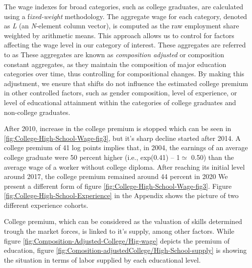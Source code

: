\begin{onehalfspace}
The wage indexes for broad categories, such as college graduates,
are calculated using a f\emph{ixed-weight} methodology. The aggregate
wage for each category, denoted as \emph{L} (an \emph{N}-element column
vector), is computed as the raw employment share weighted by arithmetic
means. This approach allows us to control for factors affecting the
wage level in our category of interest. These aggregates are referred
to as These aggregates are known as \emph{composition adjusted} or
composition constant aggregates, as they maintain the composition
of major education categories over time, thus controlling for compositional
changes. By making this adjustment, we ensure that shifts do not influence
the estimated college premium in other controlled factors, such as
gender composition, level of experience, or level of educational attainment
within the categories of college graduates and non-college graduates.

After 2010, increase in the college premium is stopped which can be
seen in \ref{fig:College-High-School-Wage-fig3}, but it's sharp decline
started after 2014. A college premium of 41 log points implies that,
in 2004, the earnings of an average college graduate were 50 percent
higher (i.e., exp(0.41) -- 1$\simeq$ 0.50) than the average wage
of a worker without college diploma. After reaching its initial level
around 2017, the college premium remained around 44 percent in 2020
We present a different form of figure \ref{fig:College-High-School-Wage-fig3}.
Figure \ref{fig:College-High-School-Experience} in the Appendix shows the picture of two different experience
cohorts.

College premium, which can be considered as the valuation of skills
determined trough the market forces, is linked to it's supply, among
other factors. While figure \ref{fig:Composition-Adjusted-College/Hig-wage}
depicts the premium of education, figure \ref{fig:Comosition-adjustedCollege/High-School-supply}
is showing the situation in terms of labor supplied by each educational
level.
\end{onehalfspace}
